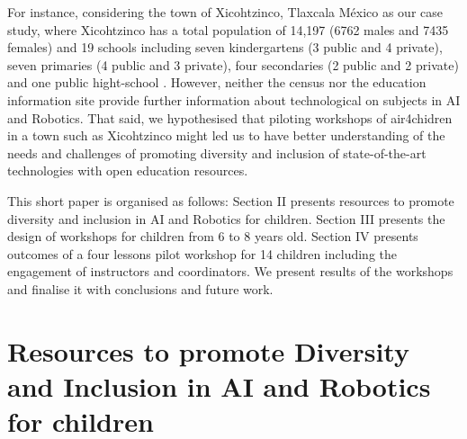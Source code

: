 \documentclass[conference]{IEEEtran}
\begin{document}
For instance, considering the town of Xicohtzinco, Tlaxcala M\'exico as our case study, where Xicohtzinco has a total population of 14,197 (6762 males and 7435 females) \cite{inegi2022} and 19 schools including seven kindergartens (3 public and 4 private), seven primaries (4 public and 3 private), four secondaries (2 public and 2 private) and one public hight-school \cite{siged2022}.
However, neither the census \cite{inegi2022} nor the education information site \cite{siged2022} provide further information about technological on subjects in AI and Robotics.
That said, we hypothesised that piloting workshops of air4chidren in a town such as Xicohtzinco might led us to have better understanding of the needs and challenges of promoting diversity and inclusion of state-of-the-art technologies with open education resources.

This short paper is organised as follows:
Section II presents resources to promote diversity and inclusion in AI and Robotics for children.
Section III presents the design of workshops for children from 6 to 8 years old.
Section IV presents outcomes of a four lessons pilot workshop for 14 children including the engagement of instructors and coordinators. 
We present results of the workshops and finalise it with conclusions and future work.


\section{Resources to promote Diversity and Inclusion in AI and Robotics for children}
\end{document}
